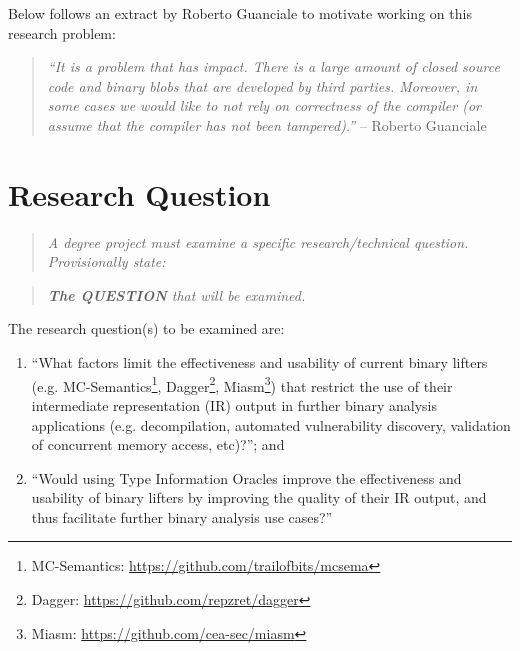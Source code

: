 \documentclass[12pt, a4paper]{article}
\begin{document}
Below follows an extract by Roberto Guanciale to motivate working on this research problem:

\begin{quote}
	\textit{``It is a problem that has impact. There is a large amount of closed source code and binary blobs that are developed by third parties. Moreover, in some cases we would like to not rely on correctness of the compiler (or assume that the compiler has not been tampered).''} -- Roberto Guanciale
\end{quote}


\section{Research Question}

\begin{quote}
	\textit{A degree project must examine a specific research/technical question. Provisionally state:}
\end{quote}

\begin{quote}
	\textit{\textbf{The QUESTION} that will be examined.}
\end{quote}

The research question(s) to be examined are:

\begin{enumerate}
	\item ``What factors limit the effectiveness and usability of current binary lifters (e.g. MC-Semantics\footnote{MC-Semantics: \url{https://github.com/trailofbits/mcsema}}, Dagger\footnote{Dagger: \url{https://github.com/repzret/dagger}}, Miasm\footnote{Miasm: \url{https://github.com/cea-sec/miasm}}) that restrict the use of their intermediate representation (IR) output in further binary analysis applications (e.g. decompilation, automated vulnerability discovery, validation of concurrent memory access, etc)?''; and
	\item ``Would using Type Information Oracles improve the effectiveness and usability of binary lifters by improving the quality of their IR output, and thus facilitate further binary analysis use cases?''
\end{enumerate}

\end{document}
